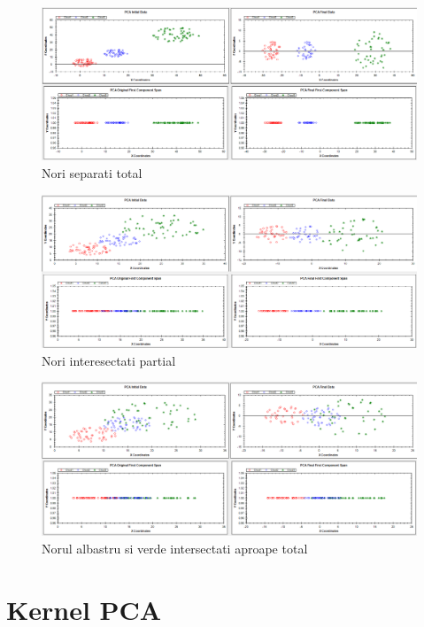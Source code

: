 \documentclass[12pt]{article}
\begin{document}
\begin{figure}[H]
\centering
\caption{Nori separati total}
\includegraphics[width=\linewidth]{threecloud1}
\end{figure}


\begin{figure}[H]
\caption{Nori interesectati partial}
\centering
\includegraphics[width=\linewidth]{threecloud2}
\end{figure}


\begin{figure}[H]
\centering
\caption{Norul albastru si verde intersectati aproape total}
\includegraphics[width=\linewidth]{threecloud3}
\end{figure}

\section{Kernel PCA}
\end{document}

